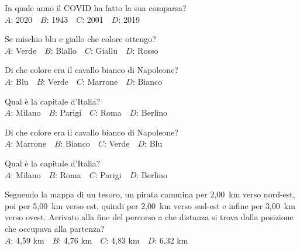 \mcquestionheader In quale anno il COVID ha fatto la sua comparsa?\\
{$A$}: 2020\ \ {$B$}: 1943\ \ {$C$}: 2001\ \ {$D$}: 2019\ \ 

\mcquestionfooter



\def\mcquestionnumber{10}


\mcquestionheader Se mischio blu e giallo che colore ottengo?\\
{$A$}: Verde\ \ {$B$}: Blallo\ \ {$C$}: Giallu\ \ {$D$}: Rosso\ \ 

\mcquestionfooter



\def\mcquestionnumber{11}


\mcquestionheader Di che colore era il cavallo bianco di Napoleone?\\
{$A$}: Blu\ \ {$B$}: Verde\ \ {$C$}: Marrone\ \ {$D$}: Bianco\ \ 

\mcquestionfooter



\def\mcquestionnumber{12}


\mcquestionheader Qual è la capitale d’Italia?\\
{$A$}: Milano\ \ {$B$}: Parigi\ \ {$C$}: Roma\ \ {$D$}: Berlino\ \ 

\mcquestionfooter



\mcpaperfooter

\def\mcserialnumber{23}
\mcpaperheader


\def\mcquestionnumber{1}


\mcquestionheader Di che colore era il cavallo bianco di Napoleone?\\
{$A$}: Marrone\ \ {$B$}: Bianco\ \ {$C$}: Verde\ \ {$D$}: Blu\ \ 

\mcquestionfooter



\def\mcquestionnumber{2}


\mcquestionheader Qual è la capitale d’Italia?\\
{$A$}: Milano\ \ {$B$}: Roma\ \ {$C$}: Parigi\ \ {$D$}: Berlino\ \ 

\mcquestionfooter



\def\mcquestionnumber{3}


\mcquestionheader Seguendo la mappa di un tesoro, un pirata cammina per 2,00~km verso nord-est, poi per 5,00~km verso est, quindi per 2,00~km verso sud-est e infine per 3,00~km verso ovest. Arrivato alla fine del percorso a che distanza si trova dalla posizione che occupava alla partenza?\\
{$A$}: 4,59 km\ \ {$B$}: 4,76 km\ \ {$C$}: 4,83 km\ \ {$D$}: 6,32 km\ \ 

